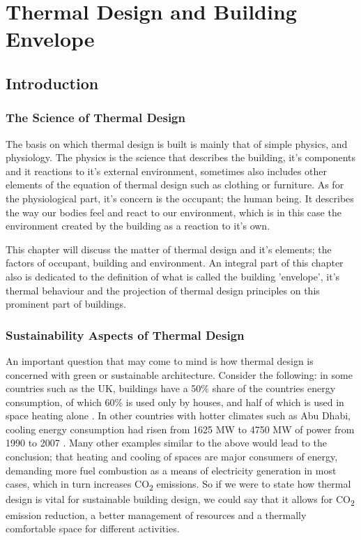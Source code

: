 \chapter{Thermal Design and Building Envelope}
\section{Introduction}

\subsection{The Science of Thermal Design}

The basis on which thermal design is built is mainly that of simple physics, and physiology. The physics is the science that describes the building, it's components and it reactions to it's external environment, sometimes also includes other elements of the equation of thermal design such as clothing or furniture. As for the physiological part, it's concern is the occupant; the human being. It describes the way our bodies feel and react to our environment, which is in this case the environment created by the building as a reaction to it's own.

This chapter will discuss the matter of thermal design and it's elements; the factors of occupant, building and environment. An integral part of this chapter also is dedicated to the definition of what is called the building 'envelope', it's thermal behaviour and the projection of thermal design principles on this prominent part of buildings.

\subsection{Sustainability Aspects of Thermal Design}
An important question that may come to mind is how thermal design is concerned with green or sustainable architecture. Consider the following: in some countries such as the UK, buildings have a 50\% share of the countries energy consumption, of which 60\% is used only by houses, and half of which is used in space heating alone \cite{edwards96}. In other countries with hotter climates such as Abu Dhabi, cooling energy consumption had risen from 1625 MW to 4750 MW of power from 1990 to 2007 \cite{nauman07}. Many other examples similar to the above would lead to the conclusion; that heating and cooling of spaces are major consumers of energy, demanding more fuel combustion as a means of electricity generation in most cases, which in turn increases CO\textsubscript{2} emissions. So if we were to state how thermal design is vital for sustainable building design, we could say that it allows for CO\textsubscript{2} emission reduction, a better management of resources and a thermally comfortable space for different activities.

